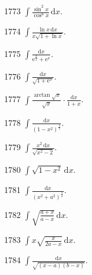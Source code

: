\begin{prob}[S]{1773}
$\int \frac{\sin^2 x}{\cos^6 x}\,\mathrm{d}x$.
\end{prob}

\begin{prob}[S]{1774}
$\int \frac{\ln x\,\mathrm{d}x}{x\sqrt{1 + \ln x}}$.
\end{prob}

\begin{prob}[S]{1775}
$\int \frac{\mathrm{d}x}{\mathrm{e}^{\frac{x}{2}} + \mathrm{e}^x}$.
\end{prob}

\begin{prob}[S]{1776}
$\int \frac{\mathrm{d}x}{\sqrt{1 + \mathrm{e}^x}}$.
\end{prob}

\begin{prob}[S]{1777}
$\int \frac{\arctan\sqrt{x}}{\sqrt{x}} \cdot \frac{\mathrm{d}x}{1 + x}$.
\end{prob}


\begin{prob}[S]{1778}
$\int \frac{\mathrm{d}x}{(1 - x^2)^{\frac{3}{2}}}$.
\end{prob}

\begin{prob}[S]{1779}
$\int \frac{x^2\,\mathrm{d}x}{\sqrt{x^2 - 2}}$.
\end{prob}

\begin{prob}[S]{1780}
$\int \sqrt{1 - x^2}\,\mathrm{d}x$.
\end{prob}

\begin{prob}[S]{1781}
$\int \frac{\mathrm{d}x}{(x^2 + a^2)^{\frac{3}{2}}}$.
\end{prob}

\begin{prob}[S]{1782}
$\int \sqrt{\frac{a + x}{a - x}}\,\mathrm{d}x$.
\end{prob}

\begin{prob}[S]{1783}
$\int x\sqrt{\frac{x}{2a - x}}\,\mathrm{d}x$.
\end{prob}

\begin{prob}[S]{1784}
$\int \frac{\mathrm{d}x}{\sqrt{(x - a)(b - x)}}$.
\end{prob}


